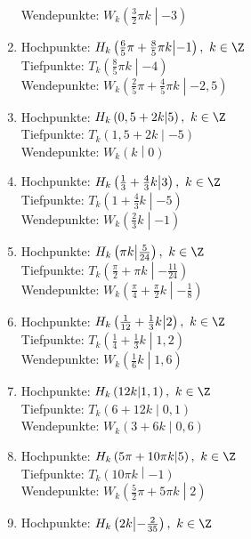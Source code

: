 \begin{Answer}[ref=sincosExtremWendeA1]
\begin{enumerate}[label=\alph*)]
		Wendepunkte: \(W_k\left(\frac{3}{2}\pi k \middle\vert-3 \right)\)
		\item Hochpunkte: \(H_k\left(\frac{6}{5}\pi+\frac{8}{5}\pi k \middle\vert-1 \right),\ k\in\Z\)\\
		Tiefpunkte: \(T_k\left(\frac{8}{5}\pi k \middle\vert-4 \right)\)\\
		Wendepunkte: \(W_k\left(\frac{2}{5}\pi+\frac{4}{5}\pi k \middle\vert-2,5 \right)\)
		\item Hochpunkte: \(H_k\left(0,5+2k \middle\vert5 \right),\ k\in\Z\)\\
		Tiefpunkte: \(T_k\left(1,5+2k \middle\vert-5 \right)\)\\
		Wendepunkte: \(W_k\left(k \middle\vert0 \right)\)
		\item Hochpunkte: \(H_k\left(\frac{1}{3}+\frac{4}{3}k \middle\vert 3\right),\ k\in\Z\)\\
		Tiefpunkte: \(T_k\left(1+\frac{4}{3}k \middle\vert -5\right)\)\\
		Wendepunkte: \(W_k\left(\frac{2}{3}k \middle\vert -1\right)\)
		\item Hochpunkte: \(H_k\left(\pi k \middle\vert\frac{5}{24} \right),\ k\in\Z\)\\
		Tiefpunkte: \(T_k\left(\frac{\pi}{2}+\pi k \middle\vert-\frac{11}{24} \right)\)\\
		Wendepunkte: \(W_k\left(\frac{\pi}{4}+\frac{\pi}{2}k \middle\vert-\frac{1}{8} \right)\)
		\item Hochpunkte: \(H_k\left(\frac{1}{12}+\frac{1}{3}k \middle\vert2 \right),\ k\in\Z\)\\
		Tiefpunkte: \(T_k\left(\frac{1}{4}+\frac{1}{3}k \middle\vert1,2 \right)\)\\
		Wendepunkte: \(W_k\left(\frac{1}{6}k \middle\vert1,6 \right)\)
		\item Hochpunkte: \(H_k\left(12k \middle\vert1,1 \right),\ k\in\Z\)\\
		Tiefpunkte: \(T_k\left(6+12k \middle\vert0,1 \right)\)\\
		Wendepunkte: \(W_k\left(3+6k \middle\vert0,6 \right)\)
		\item Hochpunkte: \(H_k\left(5\pi+10\pi k \middle\vert5 \right),\ k\in\Z\)\\
		Tiefpunkte: \(T_k\left(10\pi k \middle\vert-1 \right)\)\\
		Wendepunkte: \(W_k\left(\frac{5}{2}\pi+5\pi k \middle\vert2 \right)\)
		\item Hochpunkte: \(H_k\left(2k \middle\vert-\frac{2}{35} \right),\ k\in\Z\)\\

\end{enumerate}
\end{Answer}
